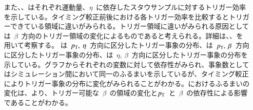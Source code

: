 また、、はそれぞれ運動量、$\eta$~に依存したスタウサンプルに対するトリガー効率を示している。タイミング較正前後における各トリガー効率を比較するとトリガーできている領域に違いがみられる。トリガー領域に違いがみられる原因としては~$\beta$~方向のトリガー領域の変化によるものであると考えられる。詳細は、、を用いて考察する。
は~$p_{\rm{T}},~\eta$~方向に区分したトリガー事象の分布、は~$p_{\rm{T}},~\beta$~方向に区分したトリガー事象の分布、は~$\eta,~\beta$~方向に区分したトリガー事象の分布を示している。グラフからそれぞれの変数に対して依存性がみられ、事象数としてはシミュレーション間において同一のふるまいを示しているが、タイミング較正によりトリガー事象の分布に変化がみられることがわかる。におけるふるまいの変化は、より、トリガー可能な~$\beta$~の領域の変化と$p_{\rm{T}}$~と~$\beta$~の依存性による影響であることがわかる。 
